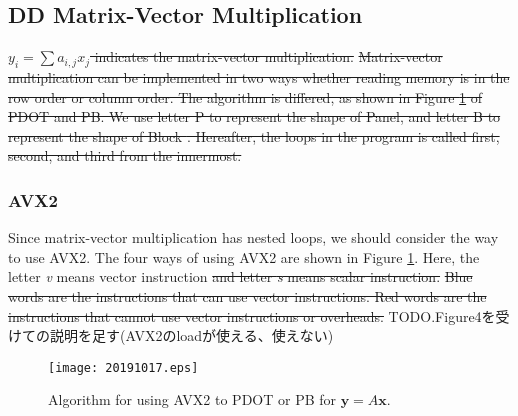 \documentclass{IOS-Book-Article}
\begin{document}
{\subsection{DD Matrix-Vector Multiplication}
\sout{$y_{i} = \sum a_{i,j}x_{j}$ indicates the matrix-vector multiplication. }
\sout{Matrix-vector multiplication can be implemented in two ways whether reading memory is in the row order or column order. The algorithm is differed, as shown in Figure \ref{figimpAVX} of PDOT and PB. We use letter P to represent the shape of Panel, and letter B to represent the shape of Block \cite{goto}. Hereafter, the loops in the program is called first, second, and third from the innermost.}

{}

\subsubsection{AVX2}
Since matrix-vector multiplication has nested loops, we should consider the way to use AVX2. 
The four ways of using AVX2 are shown in Figure \ref{figimpAVX}. 
Here, the letter {\it v} means vector instruction {}  \sout{ and letter {\it s} means scalar instruction. }
\sout{Blue words are the instructions that can use vector instructions. 
Red words are the instructions that cannot use vector instructions or overheads.}
TODO.Figure4を受けての説明を足す(AVX2のloadが使える、使えない)
\begin{figure}[htbp]
  \begin{center}
    \texttt{[image: 20191017.eps]}
    \caption{Algorithm for using AVX2 to PDOT or PB for $\bm{y} = A\bm{x}$.}
    \label{figimpAVX}
  \end{center}
\end{figure}

}
\end{document}

